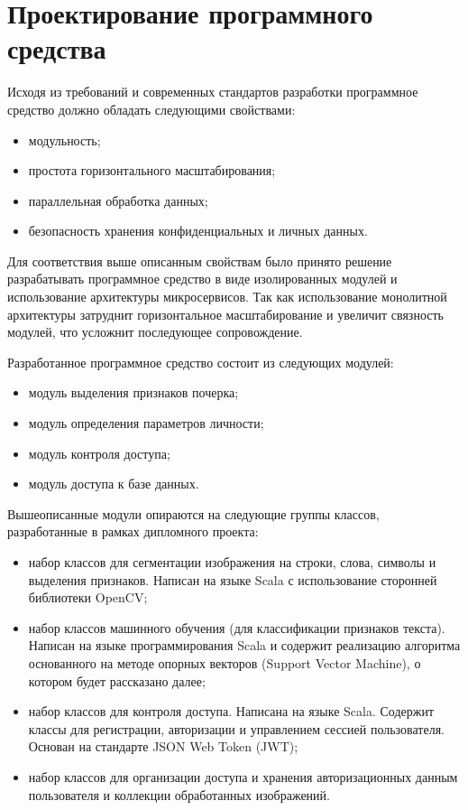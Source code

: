 \section{Проектирование программного средства}

Исходя из требований и современных стандартов разработки программное средство должно обладать следующими свойствами:
\begin{itemize}
    \item модульность;
    \item простота горизонтального масштабирования;
    \item параллельная обработка данных;
    \item безопасность хранения конфиденциальных и личных данных.
\end{itemize}

Для соответствия выше описанным свойствам было принято решение разрабатывать программное средство в виде изолированных модулей и использование архитектуры микросервисов. Так как использование монолитной архитектуры затруднит горизонтальное масштабирование и увеличит связность модулей, что усложнит последующее сопровождение. 

Разработанное программное средство состоит из следующих модулей:
\begin{itemize}
    \item модуль выделения признаков почерка;
    \item модуль определения параметров личности;
    \item модуль контроля доступа;
    \item модуль доступа к базе данных.
\end{itemize}

Вышеописанные модули опираются на следующие группы классов, разработанные в рамках дипломного проекта:
\begin{itemize}
    \item набор классов для сегментации изображения на строки, слова, символы и выделения признаков. Написан на языке Scala с использование сторонней библиотеки OpenCV;
    \item набор классов машинного обучения (для классификации признаков текста). Написан на языке программирования Scala и содержит реализацию алгоритма основанного на методе опорных векторов (Support Vector Machine), о котором будет рассказано далее;
    \item набор классов для контроля доступа. Написана на языке Scala. Содержит классы для регистрации, авторизации и управлением сессией пользователя. Основан на стандарте JSON Web Token (JWT);
    \item набор классов для организации доступа и хранения авторизационных данным пользователя и коллекции обработанных изображений.
\end{itemize}


